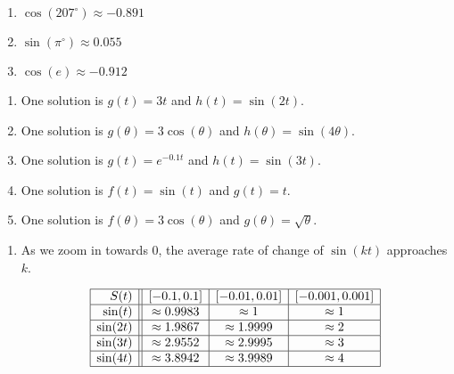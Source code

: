\begin{multicols}{3}

\begin{enumerate}

\setcounter{enumi}{\value{HW}}

\item $\cos(207^{\circ}) \approx -0.891$
\item $\sin\left( \pi^{\circ} \right) \approx 0.055$
\item $\cos(e) \approx -0.912$

\setcounter{HW}{\value{enumi}}

\end{enumerate}
\end{multicols}

\begin{enumerate}
\setcounter{enumi}{\value{HW}}

\item One solution is $g(t) = 3t$ and $h(t) = \sin(2t)$.
\item One solution is $g(\theta) = 3 \cos(\theta)$ and $h(\theta) = \sin(4 \theta)$.
\item One solution is $g(t) =  e^{-0.1t}$ and $h(t) = \sin(3t)$. 
\item One solution is $f(t) = \sin(t)$ and $g(t) = t$.
\item One solution is $f(\theta) = 3 \cos(\theta)$ and $g(\theta) = \sqrt{\theta}$.

\setcounter{HW}{\value{enumi}}
\end{enumerate}

\begin{enumerate}
\setcounter{enumi}{\value{HW}}

\item  As we zoom in towards $0$, the average rate of change of $\sin(k t)$ approaches $k$.

\[ \begin{array}{|r||c|c|c|}  \hline

 S(t) &  [-0.1, 0.1] & [-0.01, 0.01] &[-0.001, 0.001] \\ \hline
 \sin(t)     & \approx 0.9983  &  \approx 1  &  \approx 1 \\  \hline
 \sin(2t)   & \approx 1.9867 & \approx  1.9999 & \approx 2 \\ \hline
 \sin(3t)   & \approx 2.9552 & \approx 2.9995 &  \approx 3  \\  \hline
 \sin(4t)  & \approx 3.8942 & \approx 3.9989 &  \approx 4 \\  \hline

\end{array} \]

\setcounter{HW}{\value{enumi}}
\end{enumerate}



